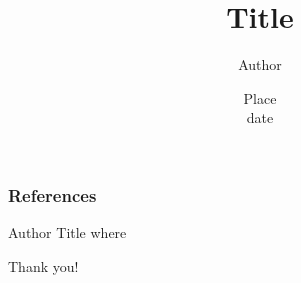 \documentclass[xcolor=pdftex,dvipsnames,table]{presentation}
\begin{document}
\title[Title] %
{
	Title
}
\author[Author] %
{
	Author
}
\date[date] %
{
	Place\\
	date
}


\frame{\titlepage}

\begin{frame}[allowframebreaks]
\frametitle{References}
  \begin{thebibliography}{10}    
  	Author
	 \newblock Title
  	 \newblock where
  \end{thebibliography}
\end{frame}

\begin{frame}
\begin{Large}
\begin{center}
Thank you!
\end{center}
\end{Large}
\end{frame}
\end{document}
